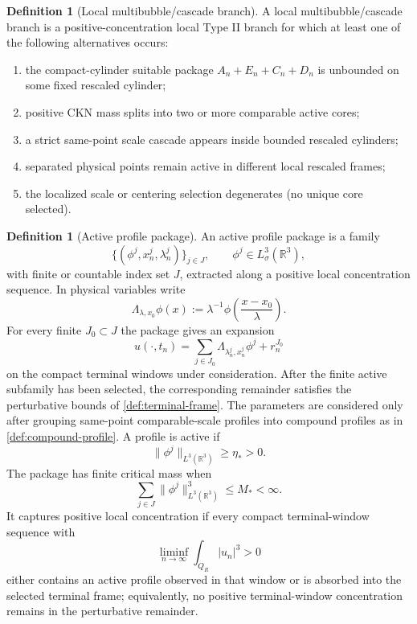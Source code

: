 \documentclass[11pt]{amsart}
\theoremstyle{plain}
\theoremstyle{definition}
\newtheorem{definition}[theorem]{Definition}
\theoremstyle{remark}
\begin{document}
\begin{definition}[Local multibubble/cascade branch]\label{def:local-multibubble}
A local multibubble/cascade branch is a positive-concentration local Type II
branch for which at least one of the following alternatives occurs:
\begin{enumerate}[label=\textup{(\roman*)}]
\item the compact-cylinder suitable package $A_n+E_n+C_n+D_n$ is unbounded on some
  fixed rescaled cylinder;
\item positive CKN mass splits into two or more comparable active cores;
\item a strict same-point scale cascade appears inside bounded rescaled cylinders;
\item separated physical points remain active in different local rescaled frames;
\item the localized scale or centering selection degenerates (no unique core
  selected).
\end{enumerate}
\end{definition}

\begin{definition}[Active profile package]\label{def:active-package}
An active profile package is a family
\[
  \{(\phi^j,x_n^j,\lambda_n^j)\}_{j\in J},
  \qquad \phi^j\in L^3_\sigma(\mathbb R^3),
\]
with finite or countable index set $J$, extracted along a positive local
concentration sequence.  In physical variables write
\[
  \Lambda_{\lambda,x_0}\phi(x):=\lambda^{-1}\phi\left(\frac{x-x_0}{\lambda}\right).
\]
For every finite \(J_0\subset J\) the package gives an expansion
\[
  u(\cdot,t_n)=\sum_{j\in J_0}\Lambda_{\lambda^j_n,x^j_n}\phi^j+r^{J_0}_n
\]
on the compact terminal windows under consideration.  After the finite active
subfamily has been selected, the corresponding remainder satisfies the
perturbative bounds of \cref{def:terminal-frame}.  The parameters are
considered only after grouping same-point comparable-scale profiles into
compound profiles as in \cref{def:compound-profile}.  A profile is active if
\[
  \|\phi^j\|_{L^3(\mathbb R^3)}\ge\eta_*>0.
\]
The package has finite critical mass when
\[
  \sum_{j\in J}\|\phi^j\|_{L^3(\mathbb R^3)}^3\le M_*<\infty .
\]
It captures positive local concentration if every compact terminal-window
sequence with
\[
  \liminf_{n\to\infty}\int_{Q_R}|u_n|^3>0
\]
either contains an active profile observed in that window or is absorbed into
the selected terminal frame; equivalently, no positive terminal-window
concentration remains in the perturbative remainder.
\end{definition}
\end{document}
